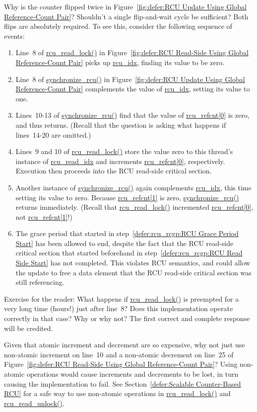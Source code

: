 \QuickQ{}
	Why is the counter flipped twice in
	Figure~\ref{fig:defer:RCU Update Using Global Reference-Count Pair}?
	Shouldn't a single flip-and-wait cycle be sufficient?
\QuickA{}
	Both flips are absolutely required.
	To see this, consider the following sequence of events:
	\begin{enumerate}
	\item	Line~8 of \url{rcu_read_lock()} in
		Figure~\ref{fig:defer:RCU Read-Side Using Global Reference-Count Pair}
		picks up \url{rcu_idx}, finding its value to be zero.
	\item	Line~8 of \url{synchronize_rcu()} in
		Figure~\ref{fig:defer:RCU Update Using Global Reference-Count Pair}
		complements the value of \url{rcu_idx}, setting its
		value to one.
	\item	Lines~10-13 of \url{synchronize_rcu()} find that the
		value of \url{rcu_refcnt[0]} is zero, and thus
		returns.
		(Recall that the question is asking what happens if
		lines~14-20 are omitted.)
	\item	Lines~9 and 10 of \url{rcu_read_lock()} store the
		value zero to this thread's instance of \url{rcu_read_idx}
		and increments \url{rcu_refcnt[0]}, respectively.
		Execution then proceeds into the RCU read-side critical
		section.
		\label{defer:rcu_rcgp:RCU Read Side Start}
	\item	Another instance of \url{synchronize_rcu()} again complements
		\url{rcu_idx}, this time setting its value to zero.
		Because \url{rcu_refcnt[1]} is zero, \url{synchronize_rcu()}
		returns immediately.
		(Recall that \url{rcu_read_lock()} incremented
		\url{rcu_refcnt[0]}, not \url{rcu_refcnt[1]}!)
		\label{defer:rcu_rcgp:RCU Grace Period Start}
	\item	The grace period that started in
		step~\ref{defer:rcu_rcgp:RCU Grace Period Start}
		has been allowed to end, despite
		the fact that the RCU read-side critical section
		that started beforehand in
		step~\ref{defer:rcu_rcgp:RCU Read Side Start}
		has not completed.
		This violates RCU semantics, and could allow the update
		to free a data element that the RCU read-side critical
		section was still referencing.
	\end{enumerate}

	Exercise for the reader: What happens if \url{rcu_read_lock()}
	is preempted for a very long time (hours!) just after
	line~8?
	Does this implementation operate correctly in that case?
	Why or why not?
	The first correct and complete response will be credited.

\QuickQ{}
	Given that atomic increment and decrement are so expensive,
	why not just use non-atomic increment on line~10 and a
	non-atomic decrement on line~25 of
	Figure~\ref{fig:defer:RCU Read-Side Using Global Reference-Count Pair}?
\QuickA{}
	Using non-atomic operations would cause increments and decrements
	to be lost, in turn causing the implementation to fail.
	See Section~\ref{defer:Scalable Counter-Based RCU}
	for a safe way to use non-atomic operations in
	\url{rcu_read_lock()} and \url{rcu_read_unlock()}.

